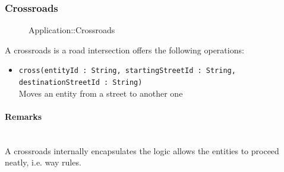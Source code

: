 \subsubsection{Crossroads}
\begin{figure}[h]
\centering
{}
\caption{Application::Crossroads}
\end{figure}
\FloatBarrier
A crossroads is a road intersection offers the following operations:
\begin{itemize}
	\item \texttt{cross(entityId : String, startingStreetId : String, destinationStreetId : String)}
	\\Moves an entity from a street to another one
\end{itemize}
\paragraph{Remarks}
\ \\A crossroads internally encapsulates the logic allows the entities to proceed neatly, i.e. way rules.